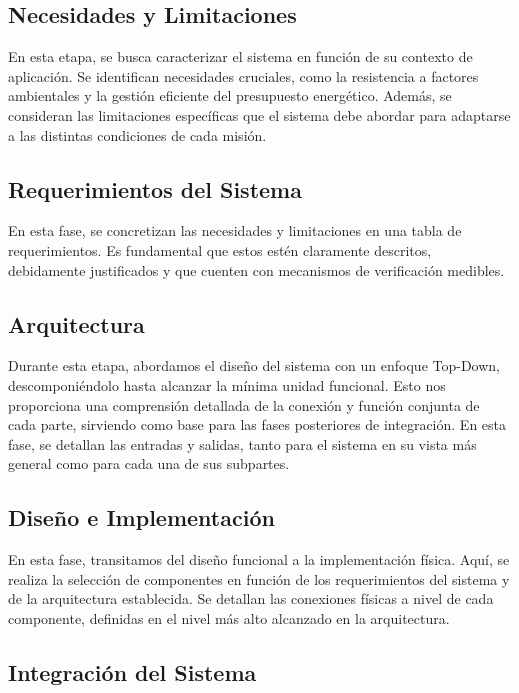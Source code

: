 \subsection{Necesidades y Limitaciones}

En esta etapa, se busca caracterizar el sistema en función de su contexto de aplicación. Se identifican necesidades cruciales, como la resistencia a factores ambientales y la gestión eficiente del presupuesto energético. Además, se consideran las limitaciones específicas que el sistema debe abordar para adaptarse a las distintas condiciones de cada misión.

\subsection{Requerimientos del Sistema}

En esta fase, se concretizan las necesidades y limitaciones en una tabla de requerimientos. Es fundamental que estos estén claramente descritos, debidamente justificados y que cuenten con mecanismos de verificación medibles.

\subsection{Arquitectura}

Durante esta etapa, abordamos el diseño del sistema con un enfoque Top-Down, descomponiéndolo hasta alcanzar la mínima unidad funcional. Esto nos proporciona una comprensión detallada de la conexión y función conjunta de cada parte, sirviendo como base para las fases posteriores de integración. En esta fase, se detallan las entradas y salidas, tanto para el sistema en su vista más general como para cada una de sus subpartes.

\subsection{Diseño e Implementación}

En esta fase, transitamos del diseño funcional a la implementación física. Aquí, se realiza la selección de componentes en función de los requerimientos del sistema y de la arquitectura establecida. Se detallan las conexiones físicas a nivel de cada componente, definidas en el nivel más alto alcanzado en la arquitectura.

\subsection{Integración del Sistema}

